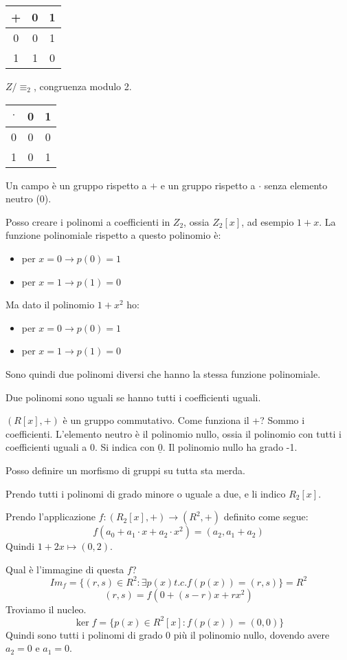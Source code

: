 \begin{tabular}{c|cc}
+ & 0 & 1 \\
\hline
0 & 0 & 1 \\
1 & 1 & 0
\end{tabular}

$Z / \equiv_2$, congruenza modulo 2.

\begin{tabular}{c|cc}
$\cdot$ & 0 & 1 \\
\hline
0 & 0 & 0 \\
1 & 0 & 1
\end{tabular}

Un campo \`e un gruppo rispetto a $+$ e un gruppo rispetto a $\cdot$ senza elemento neutro (0).

Posso creare i polinomi a coefficienti in $Z_2$, ossia $Z_2[x]$, ad esempio $1 + x$. La funzione polinomiale rispetto a questo polinomio \`e:
\begin{itemize}
    \item per $x = 0 \to p(0) = 1$
    \item per $x = 1 \to p(1) = 0$
\end{itemize}
Ma dato il polinomio $1 + x^2$ ho:
\begin{itemize}
    \item per $x = 0 \to p(0) = 1$
    \item per $x = 1 \to p(1) = 0$
\end{itemize}
Sono quindi due polinomi diversi che hanno la stessa funzione polinomiale.

Due polinomi sono uguali se hanno tutti i coefficienti uguali.

$(R[x], +)$ \`e un gruppo commutativo. Come funziona il +? Sommo i coefficienti. L'elemento neutro \`e il polinomio nullo, ossia il polinomio con tutti i coefficienti uguali a 0. Si indica con $\underline{0}$. Il polinomio nullo ha grado -1.

Posso definire un morfismo di gruppi su tutta sta merda.

Prendo tutti i polinomi di grado minore o uguale a due, e li indico $R_2[x]$.

Prendo l'applicazione $f : (R_2[x], +) \to (R^2, +)$ definito come segue:
\[
f(a_0 + a_1 \cdot x + a_2 \cdot x^2) = (a_2, a_1 + a_2)
\]
Quindi $1 + 2x \mapsto (0, 2)$.

Qual \`e l'immagine di questa $f$? 
\[
Im_f = \{ (r, s) \in R^2 : \exists p(x) t.c. f(p(x)) = (r,s)\} = R^2
\]
\[
(r, s) = f(0 + (s - r) x + r x^2)
\]
Troviamo il nucleo.
\[
\ker f = \{ p(x) \in R^2[x] : f(p(x)) = (0, 0)\}
\]
Quindi sono tutti i polinomi di grado 0 pi\`u il polinomio nullo, dovendo avere $a_2 = 0$ e $a_1 = 0$.

